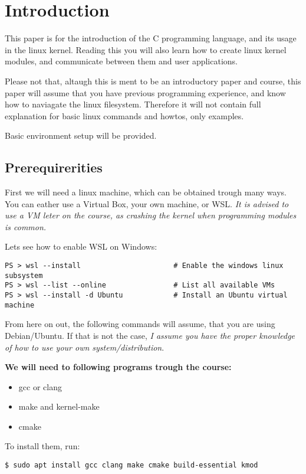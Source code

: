 \section{Introduction}

This paper is for the introduction of the C programming language, and its usage in the linux kernel.
Reading this you will also learn how to create linux kernel modules, and communicate between them and user applications.

Please not that, altaugh this is ment to be an introductory paper and course, this paper will assume that you have
previous programming experience, and know how to naviagate the linux filesystem.
Therefore it will not contain full explanation for basic linux commands and howtos, only examples.

Basic environment setup will be provided.


\subsection{Prerequirerities}

First we will need a linux machine, which can be obtained trough many ways.
You can eather use a Virtual Box, your own machine, or WSL.
\textit{It is advised to use a VM leter on the course, as crashing the kernel when programming modules is common.}

Lets see how to enable WSL on Windows: %

\begin{lstlisting}[style=CStyle,caption={Installing WSL}]
PS > wsl --install                      # Enable the windows linux subsystem
PS > wsl --list --online                # List all available VMs
PS > wsl --install -d Ubuntu            # Install an Ubuntu virtual machine

\end{lstlisting}

From here on out, the following commands will assume, that you are using Debian/Ubuntu.
If that is not the case, \textit{I assume you have the proper knowledge of how to use your own system/distribution}.

\vspace{1em}
\textbf{We will need to following programs trough the course:}
\begin{itemize}[noitemsep]
    \item gcc or clang %
    \item make and kernel-make %
    \item cmake %
\end{itemize}

To install them, run:
\begin{lstlisting}[style=CStyle,caption={Installing WSL}]
$ sudo apt install gcc clang make cmake build-essential kmod

\end{lstlisting}
